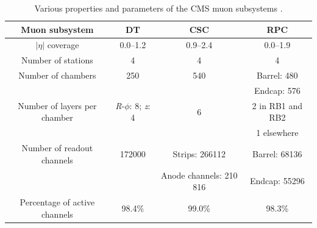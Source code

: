\begin{table}
   \caption{Various properties and parameters of the CMS muon subsystems 
	\cite{Sirunyan:2018fpa}.}
   \centering
   \begin{tabular}{cccc}
     \hline
     \hline
     Muon subsystem                &    DT                               &    CSC                  & RPC              \\
     \hline
     \hline
     $|\eta|$ coverage         & 0.0--1.2                            & 0.9--2.4                & 0.0--1.9         \\
     Number of stations            & 4                                   & 4                       & 4                \\
     Number of chambers            & 250                                 & 540                     & Barrel: 480      \\
                                   &                                     &                         & Endcap: 576      \\
     Number of layers per chamber      & \textit{R}-$\phi$: 8; \textit{z}: 4 & 6                       & 2 in RB1 and RB2 \\
                                   &                                     &                         & 1 elsewhere      \\
     Number of readout channels    & 172000                             & Strips: 266112         & Barrel: 68136   \\
                                   &                                     & Anode channels: 210 816 & Endcap: 55296   \\
     Percentage of active channels &   98.4\%                            &   99.0\%                &  98.3\%          \\
     \hline
   \end{tabular}
   \label{tab:muChamberParam}
 \end{table}

